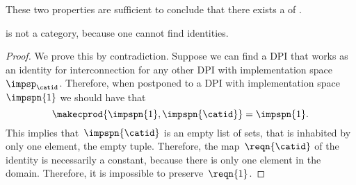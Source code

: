 These two properties are sufficient to conclude that there exists a  of .


\begin{lemma}
    \DPI is not a category, because one cannot find identities.
\end{lemma}
\begin{proof}
    We prove this by contradiction.
    Suppose we can find a DPI that works as an identity for interconnection for any other DPI with implementation space $\impsp_{\catid}$.
    Therefore, when postponed to a DPI with implementation space~$\impspn{1}$ we should have that
    \begin{equation}
        \makecprod{\impspn{1}, \impspn{\catid}} = \impspn{1}.
    \end{equation}
    This implies that~$\impspn{\catid}$ is an empty list of sets, that is inhabited by only one element, the empty tuple.
    Therefore, the map~$\reqn{\catid}$ of the identity is necessarily a constant, because there is only one element in the domain.
    Therefore, it is impossible to preserve~$\reqn{1}$.
\end{proof}



